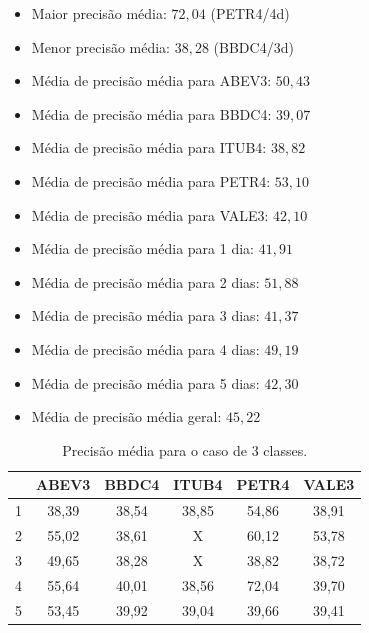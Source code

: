 \documentclass[grad,numbers]{coppe}
\begin{document}
	 			\begin{itemize}
	 				\item Maior precisão média: $72,04$ (PETR4/4d)
	 				\item Menor precisão média: $38,28$ (BBDC4/3d)
	 				\item Média de precisão média para ABEV3: $50,43$
	 				\item Média de precisão média para BBDC4: $39,07$
	 				\item Média de precisão média para ITUB4: $38,82$
	 				\item Média de precisão média para PETR4: $53,10$
	 				\item Média de precisão média para VALE3: $42,10$
	 				\item Média de precisão média para 1 dia: $41,91$
	 				\item Média de precisão média para 2 dias: $51,88$
	 				\item Média de precisão média para 3 dias: $41,37$
	 				\item Média de precisão média para 4 dias: $49,19$
	 				\item Média de precisão média para 5 dias: $42,30$
	 				\item Média de precisão média geral: $45,22$
	 			\end{itemize}
	 			\begin{table}[h]
	 				\caption{Precisão média para o caso de 3 classes.}
	 				\label{tab:3c_pr_analysis}
	 				\centering
	 				{\footnotesize
	 					\begin{tabular}{|c|c|c|c|c|c|}
	 						\hline
	 						\diagbox[linewidth=0.2pt, width=\dimexpr \textwidth/10+2\tabcolsep\relax, height=0.8cm]{Dias}{Ativo}
	 						& ABEV3 & BBDC4 & ITUB4 & PETR4 & VALE3\\
	 						\hline
	 						1 & 38,39 & 38,54 & 38,85 & 54,86 & 38,91 \\
	 						2 & 55,02 & 38,61 & X     & 60,12 & 53,78 \\
	 						3 & 49,65 & 38,28 & X     & 38,82 & 38,72 \\
	 						4 & 55,64 & 40,01 & 38,56 & 72,04 & 39,70 \\
	 						5 & 53,45 & 39,92 & 39,04 & 39,66 & 39,41 \\
	 						\hline
	 				\end{tabular}}
	 			\end{table}
\end{document}
